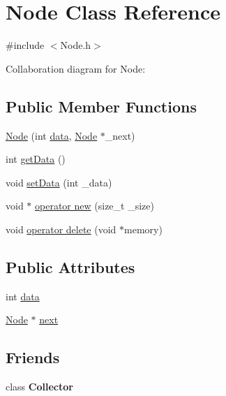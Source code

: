 \hypertarget{classNode}{}\section{Node Class Reference}
\label{classNode}


{\ttfamily \#include $<$Node.\+h$>$}



Collaboration diagram for Node\+:
\subsection*{Public Member Functions}
\begin{DoxyCompactItemize}
\item 
\hyperlink{classNode_af93785746fd98a394a2295ba2b1f523c}{Node} (int \hyperlink{classNode_a87c003c9f600e3fc58e6e90835f0b605}{data}, \hyperlink{classNode}{Node} $\ast$\+\_\+next)
\item 
int \hyperlink{classNode_aca98907146d5d0687f48bf8be9df9b7d}{get\+Data} ()
\item 
void \hyperlink{classNode_a5d4e30d05e75fb3f2c2e26a0d93f5e6c}{set\+Data} (int \+\_\+data)
\item 
void $\ast$ \hyperlink{classNode_af4e2b7adb121ee5eb5e2c38579e13cc7}{operator new} (size\+\_\+t \+\_\+size)
\item 
void \hyperlink{classNode_a57a5b45f2cac01a9df29355e579c3e9e}{operator delete} (void $\ast$memory)
\end{DoxyCompactItemize}
\subsection*{Public Attributes}
\begin{DoxyCompactItemize}
\item 
int \hyperlink{classNode_a87c003c9f600e3fc58e6e90835f0b605}{data}
\item 
\hyperlink{classNode}{Node} $\ast$ \hyperlink{classNode_a2559a716f69ccaa76d648d9f1b83065e}{next}
\end{DoxyCompactItemize}
\subsection*{Friends}
\begin{DoxyCompactItemize}
\item 
\mbox{\label{classNode_a85a0fc5a617106954db31a0e1233517f}} 
class {\bfseries Collector}
\end{DoxyCompactItemize}


